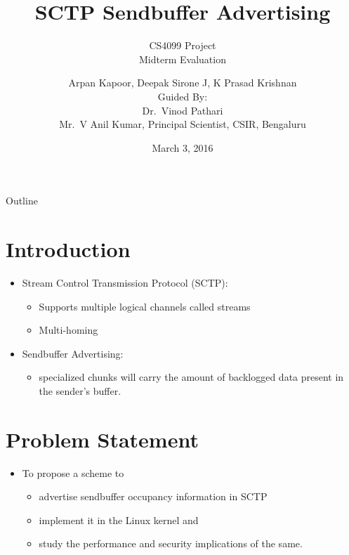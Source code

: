 \documentclass{beamer}
\title{SCTP Sendbuffer Advertising}
\subtitle{CS4099 Project\\
  Midterm Evaluation}
\author{Arpan Kapoor, Deepak Sirone J, K Prasad Krishnan\\
	Guided By:\\ Dr.~Vinod Pathari\\
	Mr.~V Anil Kumar, Principal Scientist, CSIR, Bengaluru}
\date{March 3, 2016}
\begin{document}
\begin{frame}
	\titlepage
\end{frame}

\begin{frame}{Outline}
	\tableofcontents
\end{frame}

\section{Introduction}
\begin{frame}{\insertsection}

\begin{itemize}
	\item Stream Control Transmission Protocol (SCTP):
	\begin{itemize}
		\item Supports multiple logical channels called streams
		\item Multi-homing
	\end{itemize}
\end{itemize}

\begin{itemize}
	\item Sendbuffer Advertising:
	\begin{itemize}
    \item specialized chunks will carry the amount of backlogged data
			present in the sender's buffer.
	\end{itemize}
\end{itemize}

\end{frame}

\section{Problem Statement}
\begin{frame}{\insertsection}
\begin{itemize}
\item To propose a scheme to
\begin{itemize}
\item advertise sendbuffer occupancy information in SCTP
\item implement it in the Linux kernel and
\item study the performance and security implications of the same.
\end{itemize}
\end{itemize}
\end{frame}
\end{document}
